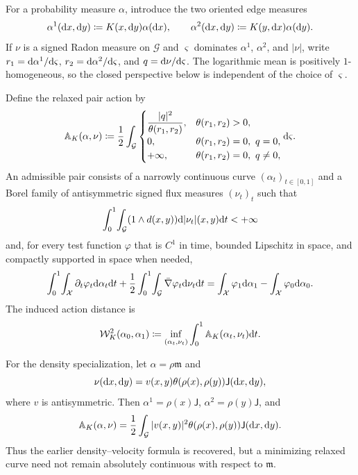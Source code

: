 For a probability measure $\alpha$, introduce the two oriented edge measures
\begin{equation}\label{eq-nonlocal-oriented-edge-measures}
	\alpha^1(\mathrm{d} x,\mathrm{d} y)\coloneqq K(x,\mathrm{d} y)\alpha(\mathrm{d} x),
	\qquad
	\alpha^2(\mathrm{d} x,\mathrm{d} y)\coloneqq K(y,\mathrm{d} x)\alpha(\mathrm{d} y).
\end{equation}
If $\nu$ is a signed Radon measure on $\mathcal G$ and $\varsigma$ dominates $\alpha^1$, $\alpha^2$, and $|\nu|$, write $r_1=\mathrm{d}\alpha^1/\mathrm{d}\varsigma$, $r_2=\mathrm{d}\alpha^2/\mathrm{d}\varsigma$, and $q=\mathrm{d}\nu/\mathrm{d}\varsigma$. The logarithmic mean is positively $1$-homogeneous, so the closed perspective below is independent of the choice of $\varsigma$.

\begin{defn}\label{def-continuum-nonlocal-wasserstein}
Define the relaxed pair action by
\begin{equation}\label{eq-nonlocal-relaxed-action}
	\mathbb A_K(\alpha,\nu)
	\coloneqq
	\frac12\int_{\mathcal G}
	\begin{cases}
	\displaystyle\frac{|q|^2}{\theta(r_1,r_2)},&\theta(r_1,r_2)>0,\\[.35em]
	0,&\theta(r_1,r_2)=0,\ q=0,\\
	+\infty,&\theta(r_1,r_2)=0,\ q\neq0,
	\end{cases}
	\mathrm{d}\varsigma.
\end{equation}
An admissible pair consists of a narrowly continuous curve $(\alpha_t)_{t\in[0,1]}$ and a Borel family of antisymmetric signed flux measures $(\nu_t)_t$ such that
\[
	\int_0^1\!\int_{\mathcal G}(1\wedge d(x,y))\mathrm{d}|\nu_t|(x,y)\mathrm{d} t<+\infty
\]
and, for every test function $\varphi$ that is $C^1$ in time, bounded Lipschitz in space, and compactly supported in space when needed,
\begin{equation}\label{eq-nonlocal-continuity-weak}
	\int_0^1\!\int_{\mathcal X}\partial_t\varphi_t\mathrm{d}\alpha_t\mathrm{d} t
	+\frac12\int_0^1\!\int_{\mathcal G}\bar\nabla\varphi_t\mathrm{d}\nu_t\mathrm{d} t
	=
	\int_{\mathcal X}\varphi_1\mathrm{d}\alpha_1-
	\int_{\mathcal X}\varphi_0\mathrm{d}\alpha_0.
\end{equation}
The induced action distance is
\begin{equation}\label{eq-nonlocal-wasserstein-distance}
	\mathcal W_K^2(\alpha_0,\alpha_1)
	\coloneqq
	\inf_{(\alpha_t,\nu_t)}\int_0^1\mathbb A_K(\alpha_t,\nu_t)\mathrm{d} t.
\end{equation}
\end{defn}

For the density specialization, let $\alpha=\rho\mathfrak m$ and
\begin{equation}\label{eq-nonlocal-density-flux}
	\nu(\mathrm{d} x,\mathrm{d} y)
	=
	v(x,y)\theta(\rho(x),\rho(y))\mathsf J(\mathrm{d} x,\mathrm{d} y),
\end{equation}
where $v$ is antisymmetric. Then $\alpha^1=\rho(x)\mathsf J$, $\alpha^2=\rho(y)\mathsf J$, and
\[
	\mathbb A_K(\alpha,\nu)
	=
	\frac12\int_{\mathcal G}|v(x,y)|^2\theta(\rho(x),\rho(y))\mathsf J(\mathrm{d} x,\mathrm{d} y).
\]
Thus the earlier density--velocity formula is recovered, but a minimizing relaxed curve need not remain absolutely continuous with respect to $\mathfrak m$.

